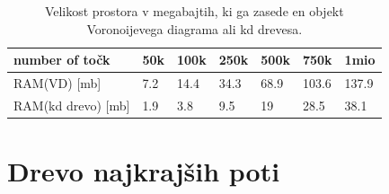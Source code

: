 \documentclass[a4paper, 12pt]{book}
\begin{document}
\begin{table}
\begin{center}
\begin{tabular}{l|l|l|l|l|l|l}
number of točk & 50k & 100k & 250k & 500k & 750k & 1mio \\ \hline \hline
RAM(VD) [mb] & 7.2 & 14.4 & 34.3 & 68.9 & 103.6 & 137.9 \\ \hline
RAM(kd drevo) [mb] & 1.9 & 3.8 & 9.5 & 19 & 28.5 & 38.1
\end{tabular}
\end{center}
\label{ram_compare}
\caption{Velikost prostora v megabajtih, ki ga zasede en objekt Voronoijevega diagrama ali kd drevesa.}
\end{table}





\section{Drevo najkrajših poti}
\end{document}
